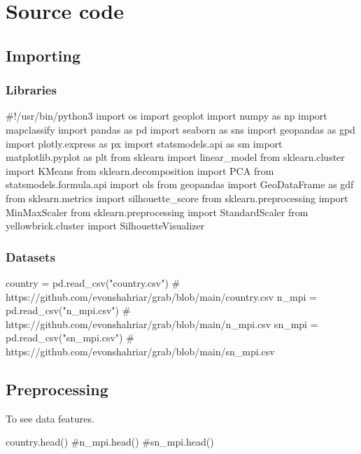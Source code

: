 \documentclass{swfuthesise}
\begin{document}
\singlespacing
\setlength{\parindent}{0pt}

\chapter{Source code}
\label{cha:code}

\section{Importing}

\subsection{Libraries}

\begin{pythoncode}
#!/usr/bin/python3
import os
import geoplot
import numpy as np
import mapclassify
import pandas as pd
import seaborn as sns
import geopandas as gpd
import plotly.express as px
import statsmodels.api as sm
import matplotlib.pyplot as plt
from sklearn import linear_model
from sklearn.cluster import KMeans
from sklearn.decomposition import PCA
from statsmodels.formula.api import ols
from geopandas import GeoDataFrame as gdf
from sklearn.metrics import silhouette_score
from sklearn.preprocessing import MinMaxScaler
from sklearn.preprocessing import StandardScaler
from yellowbrick.cluster import SilhouetteVisualizer
\end{pythoncode}

\subsection{Datasets}

\begin{pythoncode}
country = pd.read_csv("country.csv") # https://github.com/evonshahriar/grab/blob/main/country.csv
n_mpi = pd.read_csv("n_mpi.csv") # https://github.com/evonshahriar/grab/blob/main/n_mpi.csv
sn_mpi = pd.read_csv("sn_mpi.csv") # https://github.com/evonshahriar/grab/blob/main/sn_mpi.csv
\end{pythoncode}

\section{Preprocessing}

To see data features.

\begin{pythoncode}
country.head() 
#n_mpi.head()
#sn_mpi.head()
\end{pythoncode}
\end{document}
